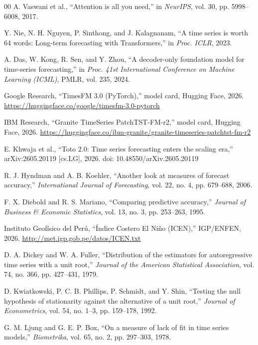 \documentclass[conference]{IEEEtran}
\begin{document}
\begin{thebibliography}{00}
A. Vaswani et al., ``Attention is all you need,'' in \textit{NeurIPS}, vol. 30, pp. 5998--6008, 2017.

Y. Nie, N. H. Nguyen, P. Sinthong, and J. Kalagnanam, ``A time series is worth 64 words: Long-term forecasting with Transformers,'' in \textit{Proc. ICLR}, 2023.

A. Das, W. Kong, R. Sen, and Y. Zhou, ``A decoder-only foundation model for time-series forecasting,'' in \textit{Proc. 41st International Conference on Machine Learning (ICML)}, PMLR, vol. 235, 2024.

Google Research, ``TimesFM 3.0 (PyTorch),'' model card, Hugging Face, 2026. \url{https://huggingface.co/google/timesfm-3.0-pytorch}

IBM Research, ``Granite TimeSeries PatchTST-FM-r2,'' model card, Hugging Face, 2026. \url{https://huggingface.co/ibm-granite/granite-timeseries-patchtst-fm-r2}

E. Khwaja et al., ``Toto 2.0: Time series forecasting enters the scaling era,'' arXiv:2605.20119 [cs.LG], 2026. doi: 10.48550/arXiv.2605.20119

R. J. Hyndman and A. B. Koehler, ``Another look at measures of forecast accuracy,'' \textit{International Journal of Forecasting}, vol. 22, no. 4, pp. 679--688, 2006.

F. X. Diebold and R. S. Mariano, ``Comparing predictive accuracy,'' \textit{Journal of Business \& Economic Statistics}, vol. 13, no. 3, pp. 253--263, 1995.

Instituto Geofísico del Perú, ``Índice Costero El Niño (ICEN),'' IGP/ENFEN, 2026. \url{http://met.igp.gob.pe/datos/ICEN.txt}

D. A. Dickey and W. A. Fuller, ``Distribution of the estimators for autoregressive time series with a unit root,'' \textit{Journal of the American Statistical Association}, vol. 74, no. 366, pp. 427--431, 1979.

D. Kwiatkowski, P. C. B. Phillips, P. Schmidt, and Y. Shin, ``Testing the null hypothesis of stationarity against the alternative of a unit root,'' \textit{Journal of Econometrics}, vol. 54, no. 1--3, pp. 159--178, 1992.

G. M. Ljung and G. E. P. Box, ``On a measure of lack of fit in time series models,'' \textit{Biometrika}, vol. 65, no. 2, pp. 297--303, 1978.


\end{thebibliography}
\end{document}
